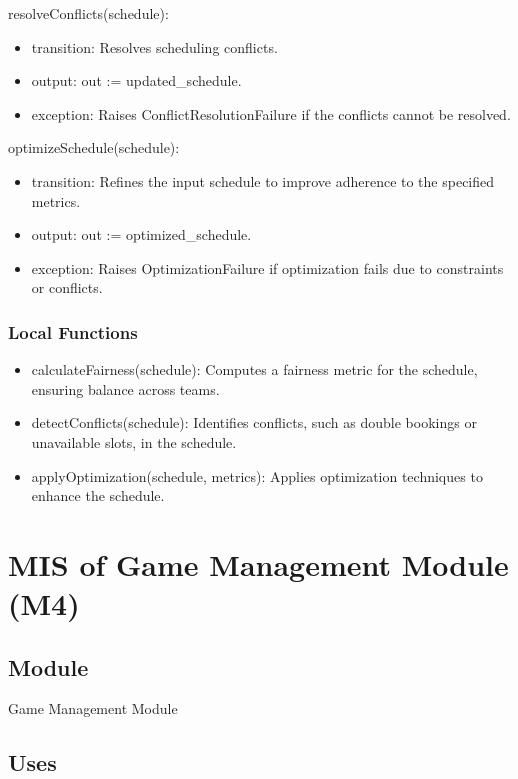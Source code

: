 \documentclass[12pt, titlepage]{article}
\begin{document}
\noindent resolveConflicts(schedule):
\begin{itemize}
  \item transition: Resolves scheduling conflicts.
  \item output: out := updated\_schedule.
  \item exception: Raises ConflictResolutionFailure if the conflicts cannot be resolved.
\end{itemize}

\noindent optimizeSchedule(schedule):
\begin{itemize}
  \item transition: Refines the input schedule to improve adherence to the specified metrics.
  \item output: out := optimized\_schedule.
  \item exception: Raises OptimizationFailure if optimization fails due to constraints or conflicts.
\end{itemize}

\subsubsection{Local Functions}
\begin{itemize}
  \item calculateFairness(schedule): Computes a fairness metric for the schedule, ensuring balance across teams.
  \item detectConflicts(schedule): Identifies conflicts, such as double bookings or unavailable slots, in the schedule.
  \item applyOptimization(schedule, metrics): Applies optimization techniques to enhance the schedule.
\end{itemize}

\newpage

\section{MIS of Game Management Module (M4)} \label{GameManagementModule}

\subsection{Module}

Game Management Module

\subsection{Uses}
\end{document}

